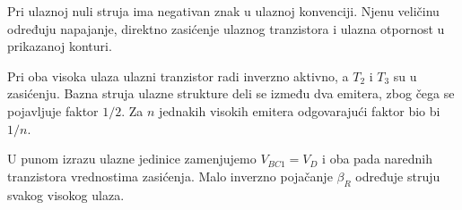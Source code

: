 Pri ulaznoj nuli struja ima negativan znak u ulaznoj konvenciji. Njenu veličinu određuju napajanje, direktno zasićenje ulaznog tranzistora i ulazna otpornost u prikazanoj konturi.

Pri oba visoka ulaza ulazni tranzistor radi inverzno aktivno, a $T_2$ i $T_3$ su u zasićenju. Bazna struja ulazne strukture deli se između dva emitera, zbog čega se pojavljuje faktor $1/2$. Za $n$ jednakih visokih emitera odgovarajući faktor bio bi $1/n$.

U punom izrazu ulazne jedinice zamenjujemo $V_{BC1}=V_D$ i oba pada narednih tranzistora vrednostima zasićenja. Malo inverzno pojačanje $\beta_R$ određuje struju svakog visokog ulaza.
